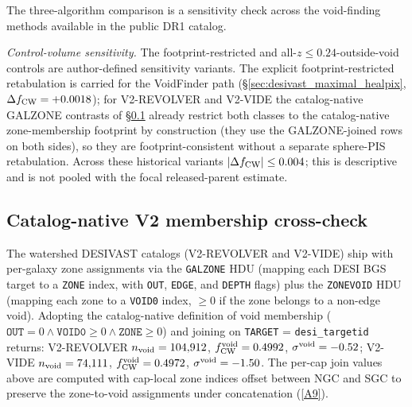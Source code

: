 \documentclass[aps,prd,twocolumn,superscriptaddress,showpacs,preprintnumbers,nofootinbib,longbibliography,floatfix]{revtex4-2}
\newcommand{\repoBase}{https://github.com/Hubify-Projects/bigbounce/blob/main}
\begin{document}
The three-algorithm comparison is a sensitivity check across the
void-finding methods available in the public DR1 catalog.

\emph{Control-volume sensitivity.} The footprint-restricted and
all-$z\le0.24$-outside-void controls are author-defined sensitivity
variants. The explicit footprint-restricted retabulation is
carried for the VoidFinder path
(\S\ref{sec:desivast_maximal_healpix}, $\Delta f_{\rm CW} = +0.0018$);
for V2-REVOLVER and V2-VIDE the catalog-native GALZONE contrasts of
\S\ref{sec:desivast_catalog_native} already restrict both classes to the
catalog-native zone-membership footprint by construction (they use the
GALZONE-joined rows on both sides), so they are footprint-consistent
without a separate sphere-PIS retabulation. Across these historical
variants $|\Delta f_{\rm CW}| \le 0.004$; this is descriptive and is
not pooled with the focal released-parent estimate.

\subsection{Catalog-native V2 membership cross-check}\label{sec:desivast_catalog_native}

The watershed
DESIVAST catalogs (V2-REVOLVER and V2-VIDE) ship with per-galaxy zone
assignments via the \texttt{GALZONE} HDU (mapping each DESI BGS target
to a \texttt{ZONE} index, with \texttt{OUT}, \texttt{EDGE}, and
\texttt{DEPTH} flags) plus the \texttt{ZONEVOID} HDU (mapping each
zone to a \texttt{VOID0} index, $\geq 0$ if the zone belongs to a
non-edge void). Adopting the catalog-native definition of void
membership ($\texttt{OUT} = 0 \wedge \texttt{VOID0} \geq 0 \wedge
\texttt{ZONE} \geq 0$) and joining on \texttt{TARGET} =
\texttt{desi\_targetid} returns: V2-REVOLVER $n_{\rm void} = 104{,}912$,
$f_{\rm CW}^{\rm void} = 0.4992$, $\sigma^{\rm void} = -0.52$; V2-VIDE
$n_{\rm void} = 74{,}111$, $f_{\rm CW}^{\rm void} = 0.4972$,
$\sigma^{\rm void} = -1.50$. The per-cap join values above are computed
with cap-local zone indices offset between NGC and SGC to preserve the
zone-to-void assignments under concatenation
(\href{\repoBase/pipelines/p5\_desi\_chirality/outputs/22\_r24conf\_local\_batch.json}{[A9]}).
\end{document}
